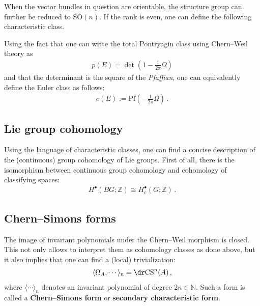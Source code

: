     When the vector bundles in question are orientable, the structure group can further be reduced to $\mathrm{SO}(n)$. If the rank is even, one can define the following characteristic class.
    \begin{property}
        Using the fact that one can write the total Pontryagin class using Chern--Weil theory as
        \begin{gather}
            p(E) = \det\left(1-\frac{1}{2\pi}\Omega\right)
        \end{gather}
        and that the determinant is the square of the \textit{Pfaffian}, one can equivalently define the Euler class as follows:
        \begin{gather}
            e(E) := \mathrm{Pf}\left(-\frac{1}{2\pi}\Omega\right)\,.
        \end{gather}
    \end{property}

\subsection{Lie group cohomology}

    Using the language of characteristic classes, one can find a concise description of the (continuous) group cohomology of Lie groups. First of all, there is the isomorphism between continuous group cohomology and cohomology of classifying spaces:
    \begin{gather}
        H^\bullet(BG;\mathbb{Z})\cong H^\bullet_c(G;\mathbb{Z})\,.
    \end{gather}

\subsection{Chern--Simons forms}\label{section:chern_simons}

    The image of invariant polynomials under the Chern--Weil morphism is closed. This not only allows to interpret them as cohomology classes as done above, but it also implies that one can find a (local) trivialization:
    \begin{gather}
        \langle\Omega_A,\cdots\rangle_n = \dr\mathrm{CS}^n(A)\,,
    \end{gather}
    where $\langle\cdots\rangle_n$ denotes an invariant polynomial of degree $2n\in\mathbb{N}$. Such a form is called a \textbf{Chern--Simons form} or \textbf{secondary characteristic form}.


